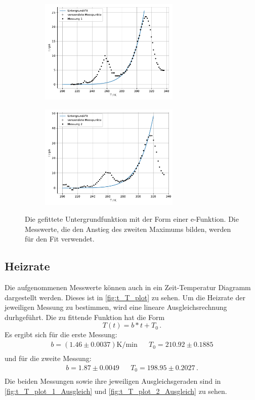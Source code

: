 \begin{figure}
  \begin{subfigure}[b]{.5\linewidth}
    \centering
    \includegraphics[height=5cm, keepaspectratio]{build/untergrund_1.pdf}
  \end{subfigure}
  \begin{subfigure}[b]{.5\linewidth}
    \centering
    \includegraphics[height=5cm, keepaspectratio]{build/untergrund_2.pdf}
  \end{subfigure}
  
  \caption{Die gefittete Untergrundfunktion mit der Form einer e-Funktion.
    Die Messwerte, die den Anstieg des zweiten Maximums bilden, werden für den Fit verwendet.}
  \label{fig:T_I_plot_Untergrund}
\end{figure} %

\subsection{Heizrate}
  Die aufgenommenen Messwerte können auch in ein Zeit-Temperatur Diagramm dargestellt werden.
  Dieses ist in \autoref{fig:t_T_plot} zu sehen.
  Um die Heizrate der jeweiligen Messung zu bestimmen, wird eine lineare Ausgleichsrechnung durhgeführt.
  Die zu fittende Funktion hat die Form
  \begin{equation*}
    T(t) = b * t + T_0 \, .
  \end{equation*}
  Es ergibt sich für die erste Messung:
  \begin{align*}
    b = (1.46 \pm 0.0037) \si{\kelvin\per\minute} &&  T_0 = 210.92 \pm 0.1885\\
  \end{align*}
  und für die zweite Messung:
  \begin{align*}
    b =  1.87 \pm 0.0049  &&  T_0 = 198.95 \pm  0.2027 \, . \\
  \end{align*}
  Die beiden Messungen sowie ihre jeweiligen Ausgleichsgeraden sind in \autoref{fig:t_T_plot_1_Ausgleich} und \autoref{fig:t_T_plot_2_Ausgleich} zu sehen.

